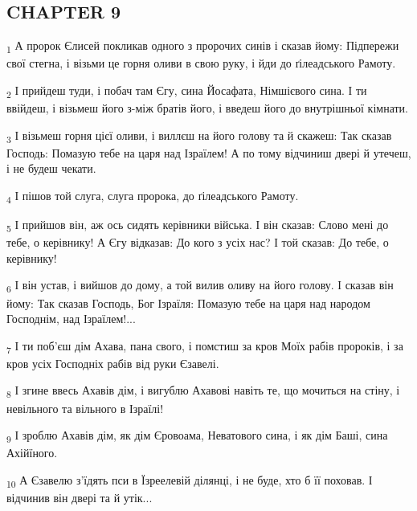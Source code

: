 \subsection{CHAPTER 9}
\begin{tcolorbox}
\textsubscript{1} А пророк Єлисей покликав одного з пророчих синів і сказав йому: Підпережи свої стегна, і візьми це горня оливи в свою руку, і йди до ґілеадського Рамоту.
\end{tcolorbox}
\begin{tcolorbox}
\textsubscript{2} І прийдеш туди, і побач там Єгу, сина Йосафата, Німшієвого сина. І ти ввійдеш, і візьмеш його з-між братів його, і введеш його до внутрішньої кімнати.
\end{tcolorbox}
\begin{tcolorbox}
\textsubscript{3} І візьмеш горня цієї оливи, і виллєш на його голову та й скажеш: Так сказав Господь: Помазую тебе на царя над Ізраїлем! А по тому відчиниш двері й утечеш, і не будеш чекати.
\end{tcolorbox}
\begin{tcolorbox}
\textsubscript{4} І пішов той слуга, слуга пророка, до ґілеадського Рамоту.
\end{tcolorbox}
\begin{tcolorbox}
\textsubscript{5} І прийшов він, аж ось сидять керівники війська. І він сказав: Слово мені до тебе, о керівнику! А Єгу відказав: До кого з усіх нас? І той сказав: До тебе, о керівнику!
\end{tcolorbox}
\begin{tcolorbox}
\textsubscript{6} І він устав, і вийшов до дому, а той вилив оливу на його голову. І сказав він йому: Так сказав Господь, Бог Ізраїля: Помазую тебе на царя над народом Господнім, над Ізраїлем!...
\end{tcolorbox}
\begin{tcolorbox}
\textsubscript{7} І ти поб'єш дім Ахава, пана свого, і помстиш за кров Моїх рабів пророків, і за кров усіх Господніх рабів від руки Єзавелі.
\end{tcolorbox}
\begin{tcolorbox}
\textsubscript{8} І згине ввесь Ахавів дім, і вигублю Ахавові навіть те, що мочиться на стіну, і невільного та вільного в Ізраїлі!
\end{tcolorbox}
\begin{tcolorbox}
\textsubscript{9} І зроблю Ахавів дім, як дім Єровоама, Неватового сина, і як дім Баші, сина Ахійїного.
\end{tcolorbox}
\begin{tcolorbox}
\textsubscript{10} А Єзавелю з'їдять пси в Їзреелевій ділянці, і не буде, хто б її поховав. І відчинив він двері та й утік...
\end{tcolorbox}
